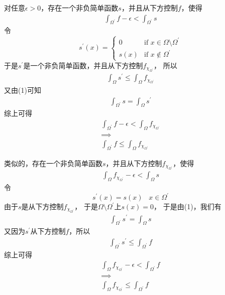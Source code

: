 \documentclass{article}
\begin{document}
\begin{itemize}
        对任意$\epsilon > 0$，存在一个非负简单函数$s$，并且从下方控制$f$，使得
        \begin{align*}
          \int_{\Omega^\prime} f - \epsilon < \int_{\Omega^\prime} s
        \end{align*}
        令
        \begin{equation*}
          s^\prime(x) = \begin{cases}
            0    & \text{if } x \in \Omega \setminus \Omega^\prime \\
            s(x) & \text{if } x \notin \Omega^\prime
          \end{cases}
        \end{equation*}
        于是$s^\prime$是一个非负简单函数，并且从下方控制$f_{\chi_{\Omega^\prime}}$，
        所以
        \begin{align*}
          \int_{\Omega} s^\prime \leq \int_{\Omega} f_{\chi_{\Omega^\prime}}
        \end{align*}
        又由(1)可知
        \begin{align*}
          \int_{\Omega^\prime} s = \int_{\Omega} s^\prime
        \end{align*}
        综上可得
        \begin{align*}
          \int_{\Omega^\prime} f - \epsilon < \int_{\Omega} f_{\chi_{\Omega^\prime}} \\
          \implies                                                                   \\
          \int_{\Omega^\prime} f \leq \int_{\Omega} f_{\chi_{\Omega^\prime}}
        \end{align*}

        类似的，存在一个非负简单函数$s$，并且从下方控制$f_{\chi_{\Omega^\prime}}$，使得
        \begin{align*}
          \int_{\Omega} f_{\chi_{\Omega^\prime}} - \epsilon < \int_{\Omega} s
        \end{align*}
        令
        \begin{equation*}
          s^\prime(x) = s(x) \;\;\; x \in \Omega^\prime
        \end{equation*}
        由于$s$是从下方控制$f_{\chi_{\Omega^\prime}}$，
        于是$\Omega \setminus \Omega^\prime$上$s(x) = 0$，
        于是由(1)，我们有
        \begin{align*}
          \int_{\Omega^\prime} s^\prime = \int_{\Omega} s
        \end{align*}
        又因为$s^\prime$从下方控制$f$，所以
        \begin{align*}
          \int_{\Omega^\prime} s^\prime \leq \int_{\Omega^\prime} f
        \end{align*}
        综上可得
        \begin{align*}
          \int_{\Omega} f_{\chi_{\Omega^\prime}} - \epsilon < \int_{\Omega^\prime} f \\
          \implies                                                                   \\
          \int_{\Omega} f_{\chi_{\Omega^\prime}} \leq \int_{\Omega^\prime} f
        \end{align*}


\end{itemize}
\end{document}
